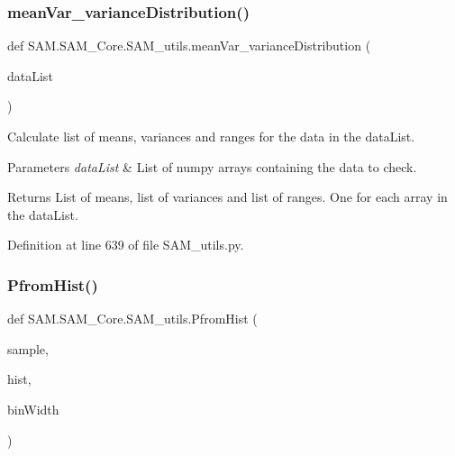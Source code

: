 \mbox{\label{group__icubclient__SAM__utils_ga82624221423212408df437771ccbd026}} 
\subsubsection{\texorpdfstring{mean\+Var\+\_\+variance\+Distribution()}{meanVar\_varianceDistribution()}}
{\footnotesize\ttfamily def S\+A\+M.\+S\+A\+M\+\_\+\+Core.\+S\+A\+M\+\_\+utils.\+mean\+Var\+\_\+variance\+Distribution (\begin{DoxyParamCaption}\item[{}]{data\+List }\end{DoxyParamCaption})}



Calculate list of means, variances and ranges for the data in the data\+List. 


\begin{DoxyParams}{Parameters}
{\em data\+List} & List of numpy arrays containing the data to check.\\
\hline
\end{DoxyParams}
\begin{DoxyReturn}{Returns}
List of means, list of variances and list of ranges. One for each array in the data\+List. 
\end{DoxyReturn}


Definition at line 639 of file S\+A\+M\+\_\+utils.\+py.

\mbox{\label{group__icubclient__SAM__utils_ga36c10c3281fd9c5aa4aeacacc693ee71}} 
\subsubsection{\texorpdfstring{Pfrom\+Hist()}{PfromHist()}}
{\footnotesize\ttfamily def S\+A\+M.\+S\+A\+M\+\_\+\+Core.\+S\+A\+M\+\_\+utils.\+Pfrom\+Hist (\begin{DoxyParamCaption}\item[{}]{sample,  }\item[{}]{hist,  }\item[{}]{bin\+Width }\end{DoxyParamCaption})}



